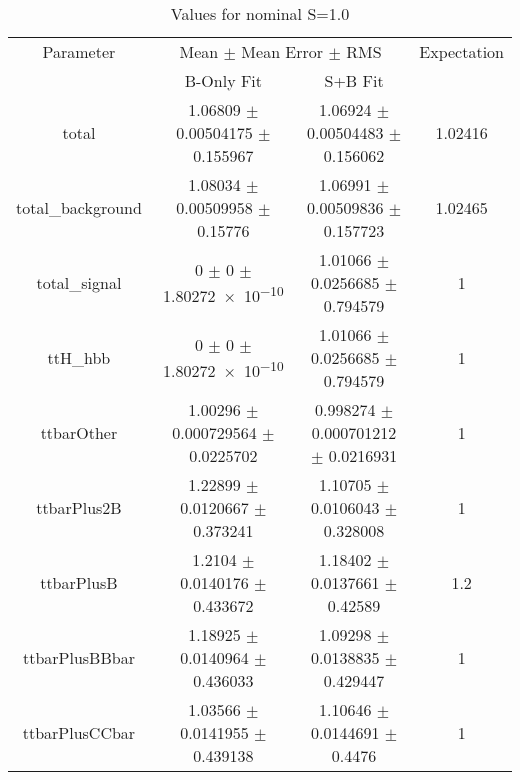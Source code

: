 \begin{table}
\centering
\caption{Values for nominal S=1.0}
\begin{tabular}{cccc}
\toprule
Parameter & \multicolumn{2}{c}{Mean $\pm$ Mean Error $\pm$ RMS} & Expectation\\
 & B-Only Fit & S+B Fit & \\
\midrule
total & \num{1.06809} $\pm$ \num{0.00504175} $\pm$ \num{0.155967} & \num{1.06924} $\pm$ \num{0.00504483} $\pm$ \num{0.156062} & \num{1.02416}\\
total\_background & \num{1.08034} $\pm$ \num{0.00509958} $\pm$ \num{0.15776} & \num{1.06991} $\pm$ \num{0.00509836} $\pm$ \num{0.157723} & \num{1.02465}\\
total\_signal & \num{0} $\pm$ \num{0} $\pm$ \num{1.80272e-10} & \num{1.01066} $\pm$ \num{0.0256685} $\pm$ \num{0.794579} & \num{1}\\
ttH\_hbb & \num{0} $\pm$ \num{0} $\pm$ \num{1.80272e-10} & \num{1.01066} $\pm$ \num{0.0256685} $\pm$ \num{0.794579} & \num{1}\\
ttbarOther & \num{1.00296} $\pm$ \num{0.000729564} $\pm$ \num{0.0225702} & \num{0.998274} $\pm$ \num{0.000701212} $\pm$ \num{0.0216931} & \num{1}\\
ttbarPlus2B & \num{1.22899} $\pm$ \num{0.0120667} $\pm$ \num{0.373241} & \num{1.10705} $\pm$ \num{0.0106043} $\pm$ \num{0.328008} & \num{1}\\
ttbarPlusB & \num{1.2104} $\pm$ \num{0.0140176} $\pm$ \num{0.433672} & \num{1.18402} $\pm$ \num{0.0137661} $\pm$ \num{0.42589} & \num{1.2}\\
ttbarPlusBBbar & \num{1.18925} $\pm$ \num{0.0140964} $\pm$ \num{0.436033} & \num{1.09298} $\pm$ \num{0.0138835} $\pm$ \num{0.429447} & \num{1}\\
ttbarPlusCCbar & \num{1.03566} $\pm$ \num{0.0141955} $\pm$ \num{0.439138} & \num{1.10646} $\pm$ \num{0.0144691} $\pm$ \num{0.4476} & \num{1}\\
\bottomrule
\end{tabular}
\end{table}